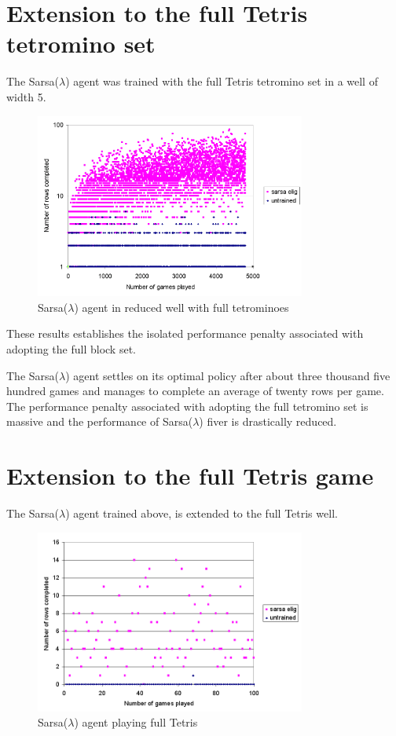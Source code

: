 \documentclass{rucsthesis}
\begin{document}
\section{Extension to the full Tetris tetromino set}

The Sarsa($\lambda$) agent was trained with the full Tetris tetromino set in a well of width 5.

\begin{figure}[h]
\centering
\includegraphics[width=3.5in]{sarsaeligfulltetredwell.png}
\caption{Sarsa($\lambda$) agent in reduced well with full tetrominoes}
\label{fig:sarsaeligfulltetredwell}
\end{figure}

These results establishes the isolated performance penalty associated with adopting the full block set.

The Sarsa($\lambda$) agent settles on its optimal policy after about three thousand five hundred games and manages to complete an average of twenty rows per game. The performance penalty associated with adopting the full tetromino set is massive and the performance of Sarsa($\lambda$) fiver is drastically reduced.

\section{Extension to the full Tetris game}

The Sarsa($\lambda$) agent trained above, is extended to the full Tetris well. 

\begin{figure}[h]
\centering
\includegraphics[width=3.5in]{sarsaeligfulltetfullwell.png}
\caption{Sarsa($\lambda$) agent playing full Tetris}
\label{fig:sarsaeligtetris}
\end{figure}
\end{document}
